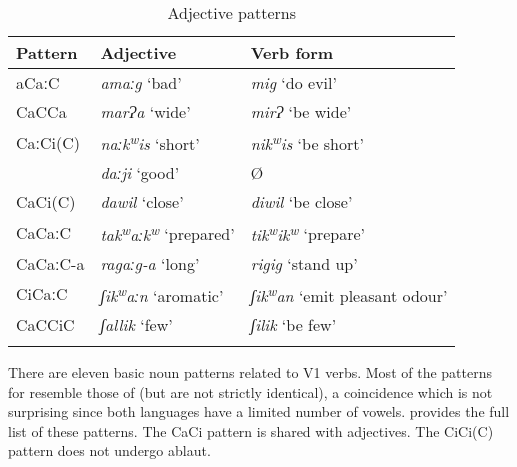 \documentclass[output=paper]{langsci/langscibook}
\begin{document}
\begin{table}
\begin{tabular}{lll}
\lsptoprule
Pattern & Adjective & Verb form\\\midrule
aCaːC & \textit{amaːg} ‘bad’ & \textit{mig} ‘do evil’\\
CaCCa & \textit{marɁa} ‘wide’ & \textit{mirɁ} ‘be wide’\\
CaːCi(C) & \textit{naːk\textsuperscript{w}}\textit{is} ‘short’ & \textit{nik\textsuperscript{w}}\textit{is} ‘be short’\\
& \textit{daːji} ‘good’ & Ø\\
CaCi(C) & \textit{dawil} ‘close’ & \textit{diwil} ‘be close’\\
CaCaːC & \textit{tak\textsuperscript{w}}\textit{aːk\textsuperscript{w}} ‘prepared’ & \textit{tik\textsuperscript{w}}\textit{ik\textsuperscript{w}} ‘prepare’\\
CaCaːC-a & \textit{ragaːg-a} ‘long’ & \textit{rigig} ‘stand up’\\
CiCaːC & \textit{ʃik\textsuperscript{w}}\textit{aːn} ‘aromatic’ & \textit{ʃik\textsuperscript{w}}\textit{an} ‘emit pleasant odour’\\
CaCCiC & \textit{ʃallik} ‘few’ & \textit{ʃilik} ‘be few’\\
\lspbottomrule
\end{tabular} 
\caption{Adjective patterns}
\label{tab:vanhove:5}
\end{table}

There are eleven basic noun patterns related to V1 verbs. Most of the patterns for   resemble those of  (but are not strictly identical), a coincidence which is not surprising since both languages have a limited number of vowels.  provides the full list of these patterns. The CaCi pattern is shared with adjectives. The CiCi(C) pattern does not undergo ablaut.
\end{document}
